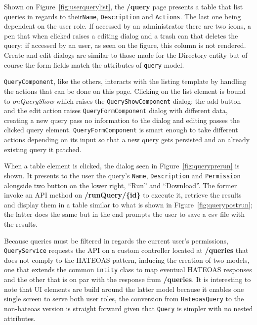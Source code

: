 Shown on Figure~\ref{fig:userquerylist}, the \textbf{/query} page presents a table that list queries in regards to their\texttt{Name}, \texttt{Description} and \texttt{Actions}. The last one being dependent on the user role. If accessed by an administrator there are two icons, a pen that when clicked raises a editing dialog and a trash can that deletes the query; if accessed by an user, as seen on the figure, this column is not rendered. Create and edit dialogs are similar to those made for the Directory entity but of course the form fields match the attributes of \texttt{query} model.

\texttt{QueryComponent}, like the others, interacts with the listing template by handling the actions that can be done on this page. Clicking on the list element is bound to \textit{onQueryShow} which raises the \texttt{QueryShowComponent} dialog; the add button and the edit action raises \texttt{QueryFormComponent} dialog with different data, creating a new query pass no information to the dialog and editing passes the clicked query element. \texttt{QueryFormComponent} is smart enough to take different actions depending on its input so that a new query gets persisted and an already existing query it patched.

When a table element is clicked, the dialog seen in Figure~\ref{fig:queryprerun} is shown. It presents to the user the query's \texttt{Name}, \texttt{Description} and \texttt{Permission} alongside two button on the lower right, ``Run'' and ``Download''. The former invoke an \gls{API} method on \textbf{/runQuery/\{id\}} to execute it, retrieve the results and display them in a table similar to what is shown in Figure~\ref{fig:querypostrun}; the latter does the same but in the end prompts the user to save a \gls{csv} file with the results. 

Because queries must be filtered in regards the current user's permissions, \texttt{QueryService} requests the \gls{API} on a custom controller located at \textbf{/queries} that does not comply to the \gls{HATEOAS} pattern, inducing the creation of two models, one that extends the common \texttt{Entity} class to map eventual \gls{HATEOAS} responses and the other that is on par with the response from \textbf{/queries}. It is interesting to note that \gls{UI} elements are build around the latter model because it enables one single screen to serve both user roles, the conversion from \texttt{HateoasQuery} to the non-hateoas version is straight forward given that \texttt{Query} is simpler with no nested attributes.

